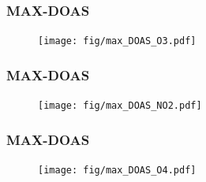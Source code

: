 \documentclass{beamer}
\begin{document}
\begin{frame}
    \frametitle{MAX-DOAS }
    \begin{figure}
    \texttt{[image: fig/max\_DOAS\_O3.pdf]}
    \end{figure}
\end{frame}

\begin{frame}
    \frametitle{MAX-DOAS }
    \begin{figure}
    \texttt{[image: fig/max\_DOAS\_NO2.pdf]}
    \end{figure}
\end{frame}


\begin{frame}
    \frametitle{MAX-DOAS }
    \begin{figure}
    \texttt{[image: fig/max\_DOAS\_O4.pdf]}
    \end{figure}
\end{frame}
\end{document}
